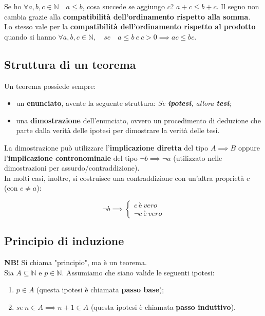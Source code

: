\documentclass{article}
\begin{document}
\noindent Se ho $\forall a,b,c \in \mathbb{N} \quad a \leq b$, cosa succede se aggiungo $c$? $a +c \leq b + c$. Il segno non cambia grazie alla \textbf{compatibilità dell'ordinamento rispetto alla somma}. \\
Lo stesso vale per la \textbf{compatibilità dell'ordinamento rispetto al prodotto} quando si hanno $\forall a,b,c \in \mathbb{N}, \quad se \quad a \leq b \ e \ c > 0 \implies ac \leq bc$.

\subsection{Struttura di un teorema}
Un teorema possiede sempre: 

\begin{itemize}
    \item un \textbf{enunciato}, avente la seguente struttura: \textit{Se \textbf{ipotesi}, allora \textbf{tesi}};
    \item una \textbf{dimostrazione} dell'enunciato, ovvero un procedimento di deduzione che parte dalla verità delle ipotesi per dimostrare la verità delle tesi.
\end{itemize}

\noindent La dimostrazione può utilizzare l'\textbf{implicazione diretta} del tipo $A \implies B$ oppure l'\textbf{implicazione contronominale} del tipo $\lnot b \implies \lnot a$ (utilizzato nelle dimostrazioni per assurdo/contraddizione). \\
In molti casi, inoltre, si costruisce una contraddizione con un'altra proprietà $c$ (con $c \neq a$):

\begin{equation*}
    \lnot b \implies \begin{cases}
        c \ è \ vero \\
        \lnot c \ è \ vero
    \end{cases}
\end{equation*}

\subsection{Principio di induzione}
\noindent\textbf{NB!} Si chiama "principio", ma è un teorema. \\

\noindent Sia $A \subseteq \mathbb{N}$ e $p \in \mathbb{N}$. Assumiamo che siano valide le seguenti ipotesi: 

\begin{enumerate}
    \item $p \in A$ (questa ipotesi è chiamata \textbf{passo base});
    \item $se \ n \in A \implies n + 1 \in A$ (questa ipotesi è chiamata \textbf{passo induttivo}).
\end{enumerate}
\end{document}
